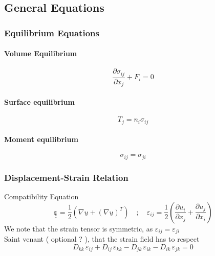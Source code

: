 \documentclass[12pt]{article}
\begin{document}
\subsection{General Equations}

\subsubsection{Equilibrium Equations}
\paragraph{Volume Equilibrium}
\begin{equation}
    \frac{\partial\sigma_{ij}}{\partial x_j} + F_i = 0
    \label{eqn: SoM volume equilibrium}
\end{equation}
\paragraph{Surface equilibrium}
\begin{equation}
    T_j = n_i \sigma_{ij}
    \label{eqn: SoM surface equilibrium}
\end{equation}
\paragraph{Moment equilibrium}
\begin{equation}
    \sigma_{ij} = \sigma_{ji}
\end{equation}

\subsubsection{Displacement-Strain Relation}
Compatibility Equation
\begin{equation}
    \underline{\underline{\boldsymbol{\varepsilon}}} = \frac{1}{2} ( \nabla \underline{u} + (\nabla \underline{u})^T )  
    \quad ; \quad  
    \varepsilon_{ij} = \frac{1}{2} \left( \frac{\partial u_i}{\partial x_j} + \frac{\partial u_j}{\partial x_i} \right)
    \label{eqn: SoM displacement-stress }
\end{equation}
We note that the strain tensor is symmetric, as $\varepsilon_{ij} = \varepsilon_{ji}$\\

Saint venant ( optional ? ), that the strain field has to respect
\begin{equation}
    D_{kk} \, \varepsilon_{ij} + D_{ij} \, \varepsilon_{kk} - D_{jk} \, \varepsilon_{ik} - D_{ik} \, \varepsilon_{jk} = 0
\end{equation}
\end{document}
